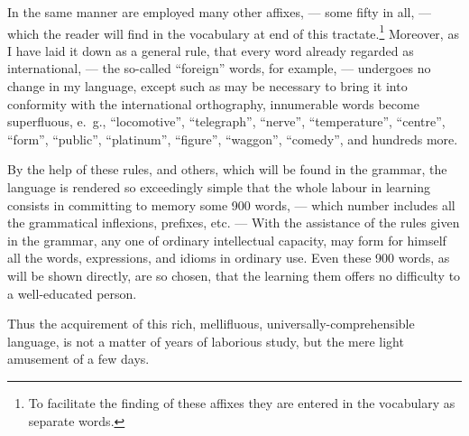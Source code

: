 In the same manner are employed many other affixes, --- some fifty in all, --- which the reader will find in the vocabulary at end of this tractate.\footnote{To facilitate the finding of these affixes they are entered in the vocabulary as separate words.} Moreover, as I have laid it down as a general rule, that every word already regarded as international, --- the so-called “foreign” words, for example, --- undergoes no change in my language, except such as may be necessary to bring it into conformity with the international orthography, innumerable words become superfluous, e.~g., “locomotive”, “telegraph”, “nerve”, “temperature”, “centre”, “form”, “public”, “platinum”, “figure”, “waggon”, “comedy”, and hundreds more.

By the help of these rules, and others, which will be found in the grammar, the language is rendered so exceedingly simple that the whole labour in learning consists in committing to memory some 900 words, --- which number includes all the grammatical inflexions, prefixes, etc. --- With the assistance of the rules given in the grammar, any one of ordinary intellectual capacity, may form for himself all the words, expressions, and idioms in ordinary use. Even these 900 words, as will be shown directly, are so chosen, that the learning them offers no difficulty to a well-educated person.

Thus the acquirement of this rich, mellifluous, universally-comprehensible language, is not a matter of years of laborious study, but the mere light amusement of a few days. 
